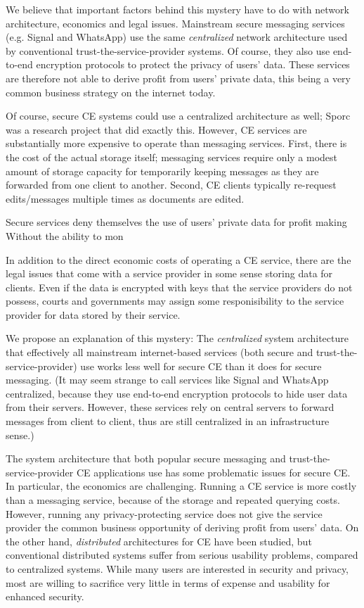 \documentclass[runningheads]{llncs}
\begin{document}
We believe that important factors behind this mystery have to do with network architecture, economics and legal issues.
Mainstream secure messaging services (e.g. Signal and WhatsApp) use the same \emph{centralized} network architecture used by conventional trust-the-service-provider systems.
Of course, they also use end-to-end encryption protocols to protect the privacy of users' data.
These services are therefore not able to derive profit from users' private data, this being a very common business strategy on the internet today.


Of course, secure CE systems could use a centralized architecture as well; Sporc\cite{} was a research project that did exactly this.
However, CE services are substantially more expensive to operate than messaging services.
First, there is the cost of the actual storage itself; messaging services require only a modest amount of storage capacity for temporarily keeping messages as they are forwarded from one client to another.
Second, CE clients typically re-request edits{\slash}messages multiple times as documents are edited.

Secure services deny themselves the use of users' private data for profit making
Without the ability to mon

In addition to the direct economic costs of operating a CE service, there are the legal issues that come with a service provider in some sense storing data for clients.
Even if the data is encrypted with keys that the service providers do not possess, courts and governments may assign some responisibility to the service provider for data stored by their service.

We propose an explanation of this mystery: The \emph{centralized} system architecture that effectively all mainstream internet-based services (both secure and trust-the-service-provider) use works less well for secure CE than it does for secure messaging.
(It may seem strange to call services like Signal and WhatsApp centralized, because they use end-to-end encryption protocols to hide user data from their servers.
However, these services rely on central servers to forward messages from client to client, thus are still centralized in an infrastructure sense.)

The  system architecture that both popular secure messaging and trust-the-service-provider CE applications use has some problematic issues for secure CE.
In particular, the economics are challenging.
Running a CE service is more costly than a messaging service, because of the storage and repeated querying costs.
However, running any privacy-protecting service does not give the service provider the common business opportunity of deriving profit from users' data.
On the other hand, \emph{distributed} architectures for CE have been studied, but conventional distributed systems suffer from serious usability problems, compared to centralized systems.
While many users are interested in security and privacy, most are willing to sacrifice very little in terms of expense and usability for enhanced security.
\end{document}

